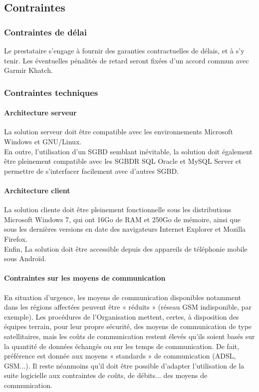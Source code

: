 \documentclass[11pt,fleqn]{book} %
\begin{document}
\subsection{Contraintes}

\subsubsection{Contraintes de délai}
Le prestataire s'engage à fournir des garanties contractuelles de délais, et à s'y tenir. Les éventuelles pénalités de retard seront fixées d'un accord commun avec Garmir Khatch.

\subsubsection{Contraintes techniques}

\paragraph{Architecture serveur}
La solution serveur doit être compatible avec les environnements Microsoft Windows et GNU/Linux.
\\
En outre, l'utilisation d'un SGBD semblant inévitable, la solution doit également être pleinement compatible avec les SGBDR SQL Oracle et MySQL Server et permettre de s'interfacer facilement avec d'autres SGBD.

\paragraph{Architecture client}
La solution cliente doit être pleinement fonctionnelle sous les distributions Microsoft Windows 7, qui ont 16Go de RAM et 250Go de mémoire, ainsi que sous les dernières versions en date des navigateurs Internet Explorer et Mozilla Firefox.
\\
Enfin, La solution doit être accessible depuis des appareils de téléphonie mobile sous Androïd.

\paragraph{Contraintes sur les moyens de communication}
En situation d'urgence, les moyens de communication disponibles notamment dans les régions affectées peuvent être « réduits » (réseau GSM indisponible, par exemple). Les procédures de l'Organisation mettent, certes, à disposition des équipes terrain, pour leur propre sécurité, des moyens de communication de type satellitaires, mais les coûts de communication restent élevés qu'ils soient basés sur la quantité de données échangés ou sur les temps de communication. De fait, préférence est donnée aux moyens « standards » de communication (ADSL, GSM...). Il reste néanmoins qu'il doit être possible d'adapter l'utilisation de la suite logicielle aux contraintes de coûts, de débits... des moyens de communication.
\end{document}
